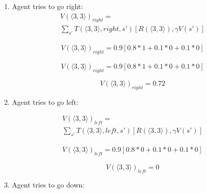 \documentclass[10pt,a4paper,twocolumn]{article}
\begin{document}
	
	\begin{enumerate}
		\item Agent tries to go right: 
		\begin{equation}
			\begin{split}
			V(\big \langle 3,3 \big \rangle)_{right} = \\ 
			\sum_{s'} T(\big \langle 3,3 \big \rangle, right, s') [R(\big \langle 3,3 \big \rangle), \gamma V(s')]
			\end{split}
		\end{equation}


		\begin{equation}
			\begin{split}
				V(\big \langle 3,3 \big \rangle)_{right} = 0.9[0.8 * 1 + 0.1 * 0 + 0.1 * 0]
				\end{split}
		\end{equation}

		\begin{equation}
			V(\big \langle 3,3 \big \rangle)_{right} = 0.9[0.8 * 1 + 0.1 * 0 + 0.1 * 0]
		\end{equation}
	
		\begin{equation}
			V(\big \langle 3,3 \big \rangle)_{right} = 0.72
		\end{equation}
		
		\item Agent tries to go left: 
		
			\begin{equation}
			\begin{split}
				V(\big \langle 3,3 \big \rangle)_{left} = \\
				 \sum_{s'} T(\big \langle 3,3 \big \rangle, left, s') [R(\big \langle 3,3 \big \rangle), \gamma V(s')]
			\end{split}
		\end{equation}
		
		
		\begin{equation}
			\begin{split}
				V(\big \langle 3,3 \big \rangle)_{left} = 0.9[0.8 * 0 + 0.1 * 0 + 0.1 * 0]
			\end{split}
		\end{equation}
		
		\begin{equation}
			V(\big \langle 3,3 \big \rangle)_{left} = 0
		\end{equation}
		

	
		\item Agent tries to go down: 
		

\end{enumerate}
\end{document}
